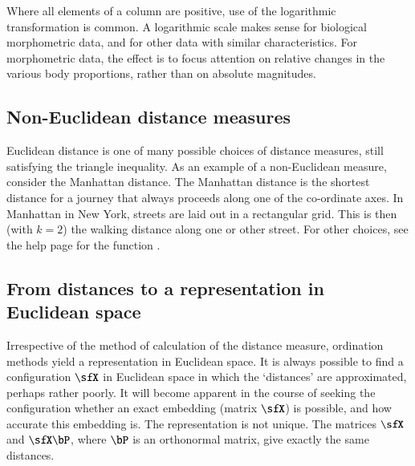 Where all elements of a column are positive, use of the
logarithmic transformation is common. A logarithmic scale makes sense
for biological morphometric data, and for other data with similar
characteristics.  For morphometric data, the effect is to focus
attention on relative changes in the various body proportions,
rather than on absolute magnitudes.

\subsection*{Non-Euclidean distance measures}

Euclidean distance is one of many possible choices of distance
measures, still satisfying the triangle inequality.  As an example of
a non-Euclidean measure, consider the Manhattan distance.
The Manhattan distance is the shortest distance for a journey that
always proceeds along one of the co-ordinate axes.  In Manhattan in
New York, streets are laid out in a rectangular grid.  This is then
(with $k=2$) the walking distance along one or other street.  For
other choices, see the help page for the function
.

\subsection*{From distances to a representation in Euclidean space}

Irrespective of the method of calculation of the distance measure,
ordination methods yield a representation in Euclidean space.  It is
always possible to find a configuration $\sfX$ in Euclidean space in
which the `distances' are approximated, perhaps rather
poorly.  It will become apparent in the course of seeking the
configuration whether an exact embedding (matrix $\sfX$) is possible,
and how accurate this embedding is.
The representation is not
unique.  The matrices $\sfX$ and $\sfX \bP$, where $\bP$ is an
orthonormal matrix, give exactly the same distances.



